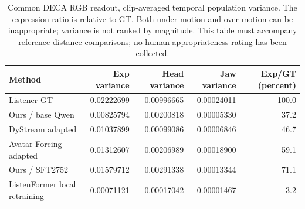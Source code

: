 \begin{table}[t]
\centering\small
\caption{Common DECA RGB readout, clip-averaged temporal population variance. The expression ratio is relative to GT. Both under-motion and over-motion can be inappropriate; variance is not ranked by magnitude. This table must accompany reference-distance comparisons; no human appropriateness rating has been collected.}
\label{tab:rgb-motion-amplitude}
\setlength{\tabcolsep}{4pt}
\begin{tabular}{lrrrr}
\toprule
Method & Exp variance & Head variance & Jaw variance & Exp/GT (percent) \\
\midrule
Listener GT & 0.02222699 & 0.00996665 & 0.00024011 & 100.0 \\
Ours / base Qwen & 0.00825794 & 0.00200818 & 0.00005330 & 37.2 \\
DyStream adapted & 0.01037899 & 0.00099086 & 0.00006846 & 46.7 \\
Avatar Forcing adapted & 0.01312607 & 0.00206989 & 0.00018900 & 59.1 \\
Ours / SFT2752 & 0.01579712 & 0.00291338 & 0.00013344 & 71.1 \\
ListenFormer local retraining & 0.00071121 & 0.00017042 & 0.00001467 & 3.2 \\
\bottomrule
\end{tabular}
\end{table}
